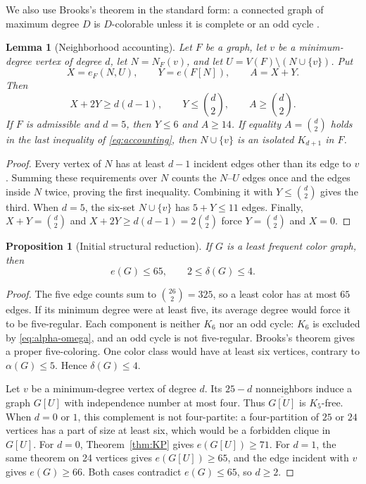 \documentclass[11pt,reqno,a4paper]{amsart}
\newtheorem{proposition}[theorem]{Proposition}
\newtheorem{lemma}[theorem]{Lemma}
\theoremstyle{definition}
\theoremstyle{remark}
\newcommand{\comp}[1]{\overline{#1}}
\begin{document}
We also use Brooks's theorem in the standard form: a connected graph of
maximum degree $D$ is $D$-colorable unless it is complete or an odd cycle
\cite{Brooks1941}.

\begin{lemma}[Neighborhood accounting]\label{lem:accounting}
Let $F$ be a graph, let $v$ be a minimum-degree vertex of degree $d$, let
$N=N_F(v)$, and let $U=V(F)\setminus(N\cup\{v\})$.  Put
\[
  X=e_F(N,U),\qquad Y=e(F[N]),\qquad A=X+Y.
\]
Then
\begin{equation}\label{eq:accounting}
  X+2Y\geq d(d-1),\qquad
  Y\leq\binom d2,\qquad
  A\geq\binom d2.
\end{equation}
If $F$ is admissible and $d=5$, then $Y\leq6$ and $A\geq14$.  If equality
$A=\binom d2$ holds in the last inequality of \eqref{eq:accounting}, then
$N\cup\{v\}$ is an isolated $K_{d+1}$ in $F$.
\end{lemma}

\begin{proof}
Every vertex of $N$ has at least $d-1$ incident edges other than its edge to
$v$.  Summing these requirements over $N$ counts the $N$--$U$ edges once and
the edges inside $N$ twice, proving the first inequality.  Combining it with
$Y\leq\binom d2$ gives the third.  When $d=5$, the six-set
$N\cup\{v\}$ has $5+Y\leq11$ edges.  Finally,
$X+Y=\binom d2$ and $X+2Y\geq d(d-1)=2\binom d2$ force
$Y=\binom d2$ and $X=0$.
\end{proof}

\begin{proposition}[Initial structural reduction]\label{prop:initial}
If $G$ is a least frequent color graph, then
\[
  e(G)\leq65,
  \qquad
  2\leq\delta(G)\leq4.
\]
\end{proposition}

\begin{proof}
The five edge counts sum to $\binom{26}{2}=325$, so a least color has at
most $65$ edges.  If its minimum degree were at least five, its average
degree would force it to be five-regular.  Each component is neither $K_6$
nor an odd cycle: $K_6$ is excluded by \eqref{eq:alpha-omega}, and an odd
cycle is not five-regular.  Brooks's theorem gives a proper five-coloring.  One
color class would have at least six vertices, contrary to
$\alpha(G)\leq5$.  Hence $\delta(G)\leq4$.

Let $v$ be a minimum-degree vertex of degree $d$.  Its $25-d$ nonneighbors
induce a graph $G[U]$ with independence number at most four.  Thus
$\comp{G[U]}$ is $K_5$-free.  When $d=0$ or $1$, this complement is not
four-partite: a four-partition of $25$ or $24$ vertices has a part of size
at least six, which would be a forbidden clique in $G[U]$.  For $d=0$,
Theorem~\ref{thm:KP} gives $e(G[U])\geq71$.  For $d=1$, the same theorem on
24 vertices gives $e(G[U])\geq65$, and the edge incident with $v$ gives
$e(G)\geq66$.  Both cases contradict $e(G)\leq65$, so $d\geq2$.
\end{proof}
\end{document}
